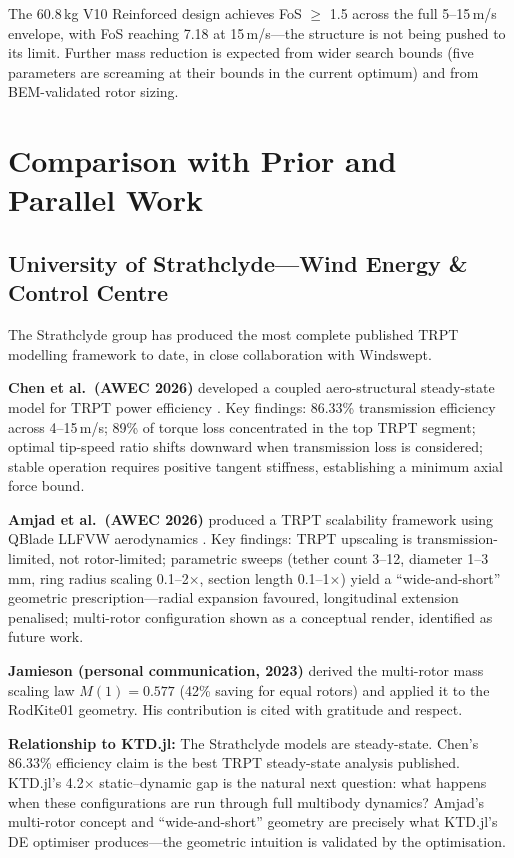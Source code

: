 \documentclass[11pt,a4paper]{article}
\begin{document}
The 60.8\,kg V10 Reinforced design achieves FoS $\geq$ 1.5 across the full 5--15\,m/s envelope, with FoS reaching 7.18 at 15\,m/s---the structure is not being pushed to its limit.
Further mass reduction is expected from wider search bounds (five parameters are screaming at their bounds in the current optimum) and from BEM-validated rotor sizing.

\section{Comparison with Prior and Parallel Work}

\subsection{University of Strathclyde---Wind Energy \& Control Centre}

The Strathclyde group has produced the most complete published TRPT modelling framework to date, in close collaboration with Windswept.

\textbf{Chen et al.\ (AWEC 2026)} developed a coupled aero-structural steady-state model for TRPT power efficiency \cite{chen2026}.
Key findings: 86.33\% transmission efficiency across 4--15\,m/s; 89\% of torque loss concentrated in the top TRPT segment; optimal tip-speed ratio shifts downward when transmission loss is considered; stable operation requires positive tangent stiffness, establishing a minimum axial force bound.

\textbf{Amjad et al.\ (AWEC 2026)} produced a TRPT scalability framework using QBlade LLFVW aerodynamics \cite{amjad2026}.
Key findings: TRPT upscaling is transmission-limited, not rotor-limited; parametric sweeps (tether count 3--12, diameter 1--3\,mm, ring radius scaling 0.1--2$\times$, section length 0.1--1$\times$) yield a ``wide-and-short'' geometric prescription---radial expansion favoured, longitudinal extension penalised; multi-rotor configuration shown as a conceptual render, identified as future work.

\textbf{Jamieson (personal communication, 2023)} derived the multi-rotor mass scaling law $M(1) = 0.577$ (42\% saving for equal rotors) and applied it to the RodKite01 geometry.
His contribution is cited with gratitude and respect.

\textbf{Relationship to KTD.jl:}
The Strathclyde models are steady-state.
Chen's 86.33\% efficiency claim is the best TRPT steady-state analysis published.
KTD.jl's 4.2$\times$ static--dynamic gap is the natural next question: what happens when these configurations are run through full multibody dynamics?
Amjad's multi-rotor concept and ``wide-and-short'' geometry are precisely what KTD.jl's DE optimiser produces---the geometric intuition is validated by the optimisation.
\end{document}
